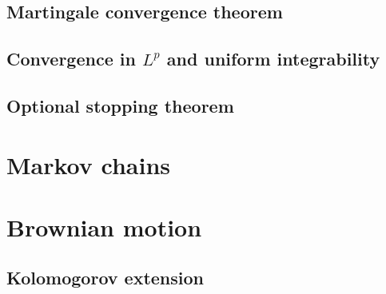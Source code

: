 \documentclass{../note}
\begin{document}
\section{Martingale convergence theorem}
\begin{prb}
\begin{parts}
\item
\end{parts}
\end{prb}

\begin{prb}
\begin{parts}
\item
\end{parts}
\end{prb}

\begin{prb}
\begin{parts}
\item
\end{parts}
\end{prb}

\section{Convergence in $L^p$ and uniform integrability}

\section{Optional stopping theorem}





\chapter{Markov chains}
\chapter{Brownian motion}
\section{Kolomogorov extension}
\end{document}
